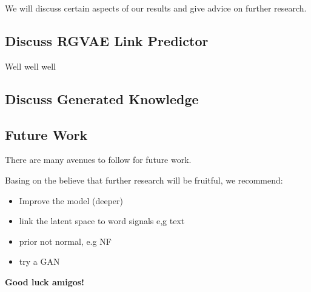 We will discuss certain aspects of our results and give advice on further research.

\subsection{Discuss RGVAE Link Predictor}

Well well well

\subsection{Discuss Generated Knowledge}


\subsection{Future Work}

There are many avenues to follow for future work.

Basing on the believe that further research will be fruitful, we recommend:

\begin{itemize}
    \item Improve the model (deeper)
    \item link the latent space to word signals e,g text
    \item prior not normal, e.g NF
    \item try a GAN
\end{itemize}

\textbf{Good luck amigos!}
